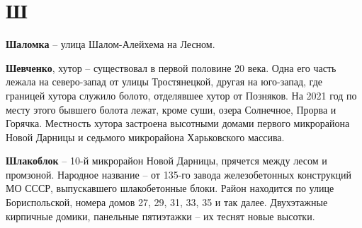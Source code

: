 \chapter*{Ш}

\textbf{Шаломка} – улица Шалом-Алейхема на Лесном.\\

\medskip

\textbf{Шевченко}, хутор – существовал в первой половине 20 века. Одна его часть лежала на северо-запад от улицы Тростянецкой, другая на юго-запад, где границей хутора служило болото, отделявшее хутор от Позняков. На 2021 год по месту этого бывшего болота лежат, кроме суши, озера Солнечное, Прорва и Горячка. Местность хутора застроена высотными домами первого микрорайона Новой Дарницы и седьмого микрорайона Харьковского массива.\\

\medskip







\textbf{Шлакоблок} – 10-й микрорайон Новой Дарницы, прячется между лесом и промзоной. Народное название – от 135-го завода железобетонных конструкций МО СССР, выпускавшего шлакобетонные блоки. Район находится по улице Бориспольской, номера домов 27, 29, 31, 33, 35 и так далее. Двухэтажные кирпичные домики, панельные пятиэтажки – их теснят новые высотки.
